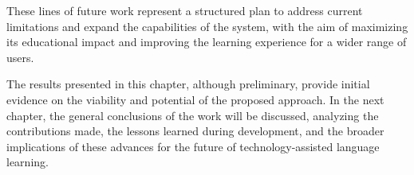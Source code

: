 These lines of future work represent a structured plan to address current limitations and expand the capabilities of the system, with the aim of maximizing its educational impact and improving the learning experience for a wider range of users.

The results presented in this chapter, although preliminary, provide initial evidence on the viability and potential of the proposed approach. In the next chapter, the general conclusions of the work will be discussed, analyzing the contributions made, the lessons learned during development, and the broader implications of these advances for the future of technology-assisted language learning.